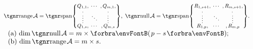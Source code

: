 $\range\mA={}\Spn{\small\begin{Bmatrix} \underset{\;,}{Q_{1,1}}, &\hspace{-6pt} \cdots &\hspace{-6pt} ,\underset{\!,}{Q_{m,1}},\\[-2pt] \vdots &\hspace{-6pt} \ddots &\hspace{-6pt} \vdots\\[-2pt] \overset{\;,}{Q_{1,s}}, &\hspace{-6pt} \cdots &\hspace{-6pt} ,\overset{\!\!\!,}{Q_{m,s}}\end{Bmatrix}},\;\null \mA=\Spn{\small\begin{Bmatrix} \underset{\;,}{R_{1,s+1}}, &\hspace{-6pt} \cdots &\hspace{-6pt} ,\underset{\!\!,}{R_{m,s+1}},\\[-2pt] \vdots &\hspace{-6pt} \ddots &\hspace{-6pt} \vdots\\[-2pt] \overset{\;,}{R_{1,p}}, &\hspace{-6pt} \cdots &\hspace{-6pt} ,\overset{\!\!\!,}{R_{m,p}}\end{Bmatrix}}.$
\;\;$\hText{$
(a) $\dim\null \mA=m\times\Par{p-s};\\$
(b) $\dim\range \mA=m\times s.}$\par\PfEnd[-10pt]\vspace{-4pt}
\SepLine

